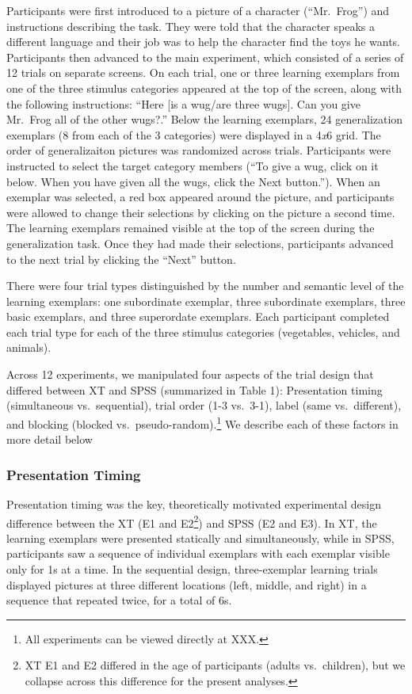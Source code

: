 \documentclass[english,floatsintext,man]{apa6}
\theoremstyle{definition}
\theoremstyle{definition}
\theoremstyle{remark}
\begin{document}
Participants were first introduced to a picture of a character
(\enquote{Mr.~Frog}) and instructions describing the task. They were
told that the character speaks a different language and their job was to
help the character find the toys he wants. Participants then advanced to
the main experiment, which consisted of a series of 12 trials on
separate screens. On each trial, one or three learning exemplars from
one of the three stimulus categories appeared at the top of the screen,
along with the following instructions: \enquote{Here {[}is a wug/are
three wugs{]}. Can you give Mr.~Frog all of the other wugs?.} Below the
learning exemplars, 24 generalization exemplars (8 from each of the 3
categories) were displayed in a 4\emph{x}6 grid. The order of
generalizaiton pictures was randomized across trials. Participants were
instructed to select the target category members (\enquote{To give a
wug, click on it below. When you have given all the wugs, click the Next
button.}). When an exemplar was selected, a red box appeared around the
picture, and participants were allowed to change their selections by
clicking on the picture a second time. The learning exemplars remained
visible at the top of the screen during the generalization task. Once
they had made their selections, participants advanced to the next trial
by clicking the \enquote{Next} button.

There were four trial types distinguished by the number and semantic
level of the learning exemplars: one subordinate exemplar, three
subordinate exemplars, three basic exemplars, and three superordate
exemplars. Each participant completed each trial type for each of the
three stimulus categories (vegetables, vehicles, and animals).

Across 12 experiments, we manipulated four aspects of the trial design
that differed between XT and SPSS (summarized in Table 1): Presentation
timing (simultaneous vs.~sequential), trial order (1-3 vs.~3-1), label
(same vs.~different), and blocking (blocked
vs.~pseudo-random).\footnote{All experiments can be viewed directly at XXX.}
We describe each of these factors in more detail below

\subsubsection{Presentation Timing}\label{presentation-timing}

Presentation timing was the key, theoretically motivated experimental
design difference between the XT (E1 and
E2\footnote{XT E1 and E2 differed in the age of participants (adults vs.\ children), but we collapse across this difference for the present analyses.})
and SPSS (E2 and E3). In XT, the learning exemplars were presented
statically and simultaneously, while in SPSS, participants saw a
sequence of individual exemplars with each exemplar visible only for 1s
at a time. In the sequential design, three-exemplar learning trials
displayed pictures at three different locations (left, middle, and
right) in a sequence that repeated twice, for a total of 6s.
\end{document}
